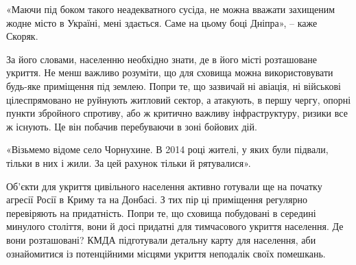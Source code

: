 «Маючи під боком такого неадекватного сусіда, не можна вважати захищеним жодне
місто в Україні, мені здається. Саме на цьому боці Дніпра», – каже Скоряк.


За його словами, населенню необхідно знати, де в його місті розташоване
укриття. Не менш важливо розуміти, що для сховища можна використовувати
будь-яке приміщення під землею. Попри те, що зазвичай ні авіація, ні військові
цілеспрямовано не руйнують житловий сектор, а атакують, в першу чергу, опорні
пункти збройного спротиву, або ж критично важливу інфраструктуру, ризики все ж
існують. Це він побачив перебуваючи в зоні бойових дій.

«Візьмемо відоме село Чорнухине. В 2014 році жителі, у яких були підвали,
тільки в них і жили. За цей рахунок тільки й рятувалися».

Об’єкти для укриття цивільного населення активно готували ще на початку агресії
Росії в Криму та на Донбасі. З тих пір ці приміщення регулярно перевіряють на
придатність. Попри те, що сховища побудовані в середині минулого століття, вони
й досі придатні для тимчасового укриття населення. Де вони розташовані? КМДА
підготували детальну карту для населення, аби ознайомитися із
потенційними місцями укриття неподалік своїх помешкань.
